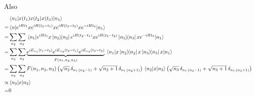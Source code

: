 \documentclass[a4paper,11pt]{article}
\begin{document}
Also
\begin{equation}
\begin{aligned}
&\mel{n_1}{x(t_1)x(t_2)x(t_3)}{n_1}\\
=&\mel{n}{e^{iHt_1}xe^{iH(t_2-t_1)}xe^{iH(t_3-t_2)}xe^{-iHt_3}}{n_1}\\
=&\sum_{n_2}\sum_{n_3}\mel{n_1}{e^{iHt_1}x\dyad{n_2}{n_2}e^{iH(t_2-t_1)}xe^{iH(t_3-t_2)}\dyad{n_3}{n_3}xe^{-iHt_3}}{n_1}
\\
=&\sum_{n_2}\sum_{n_3}\underbrace{e^{iE_{n_1}(t_1-t_3)}e^{iE_{n_2}(t_2-t_1)}e^{iE_{n_3}(t_3-t_2)}}_{F(n_1,n_2,n_3)}\mel{n_1}{x\dyad{n_2}{n_2}x\dyad{n_3}{n_3}x}{n_1}
\\
=&\sum_{n_2}\sum_{n_3}F(n_1,n_2,n_3)\left(\sqrt{n_2}\,\delta_{n_1\,(n_2-1)}+\sqrt{n_2+1}\,\delta_{n_1\,(n_2+1)}\right)\mel{n_2}{x}{n_3}\left(\sqrt{n_3}\,\delta_{n_1\,(n_3-1)}+\sqrt{n_3+1}\,\delta_{n_1\,(n_3+1)}\right)\\
\propto&\mel{n_2}{x}{n_2}\\
=&0
\end{aligned}
\end{equation}
\newpage
\end{document}
